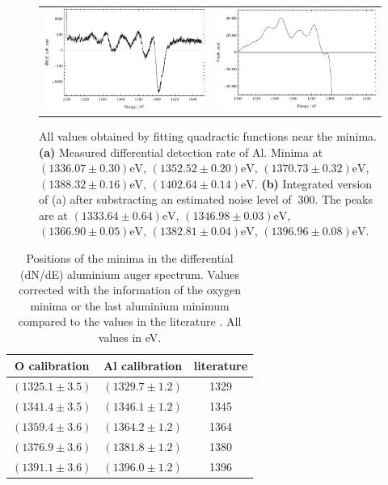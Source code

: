 \documentclass[a4paper]{scrartcl}
\numberwithin{equation}{section}
\numberwithin{figure}{section}
\numberwithin{table}{section}
\begin{document}
\label{sec:kll}
\begin{figure}[!h]
        \begin{center}
		  \begin{tabular}{l r}
        		\includegraphics[width=0.48\linewidth]{pic/auger.pdf}
			&
				\includegraphics[width=0.48\linewidth]{pic/augerSum.pdf}
        \end{tabular}
        \end{center}
        \caption[(differential) detection rate at the Al specific energies]{
			\small All values obtained by fitting quadractic functions near the minima.
			\textbf{(a)} Measured differential detection rate of Al. Minima at $(1336.07\pm 0.30)\text{eV}$, $(1352.52\pm 0.20)\text{eV}$, $(1370.73\pm 0.32)\text{eV}$, $(1388.32\pm 0.16)\text{eV}$, $(1402.64\pm 0.14)\text{eV}$.
			\textbf{(b)} Integrated version of (a) after substracting an estimated noise level of $~300$. The peaks are at $(1333.64\pm 0.64)\text{eV}$, $(1346.98\pm 0.03)\text{eV}$, $(1366.90\pm 0.05)\text{eV}$, $(1382.81\pm 0.04)\text{eV}$, $(1396.96\pm 0.08)\text{eV}$.
        }
        \label{fig:auger}
\end{figure} 
\FloatBarrier
\begin{table}[!h]
\centering
\begin{tabular}{ccc}
\toprule
O calibration & Al calibration & literature \\
\midrule
$(1325.1\pm 3.5)$ & $(1329.7\pm 1.2)$ & 1329 \\
$(1341.4\pm 3.5)$ & $(1346.1\pm 1.2)$ & 1345 \\
$(1359.4\pm 3.6)$ & $(1364.2\pm 1.2)$ & 1364 \\
$(1376.9\pm 3.6)$ & $(1381.8\pm 1.2)$ & 1380 \\
$(1391.1\pm 3.6)$ & $(1396.0\pm 1.2)$ & 1396 \\
 \bottomrule
\end{tabular}
\caption{\small Positions of the minima in the differential (dN/dE) aluminium auger spectrum. Values corrected with the information of the oxygen minima or the last aluminium minimum compared to the values in the literature \cite{handbook}. All values in eV. }
\label{tab:OAlL}
\end{table}
\end{document}
